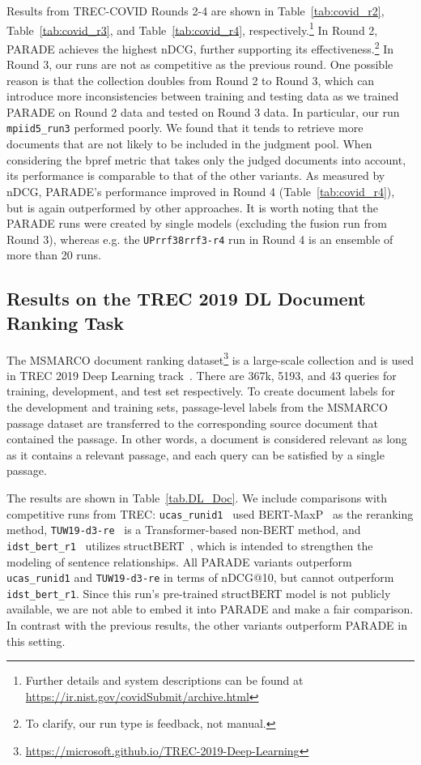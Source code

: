 \documentclass[11pt,a4paper]{article}
\newcommand{\parade}[1]{PARADE}
\begin{document}
Results from TREC-COVID Rounds 2-4 are shown in Table~\ref{tab:covid_r2}, Table~\ref{tab:covid_r3}, and Table~\ref{tab:covid_r4}, respectively.\footnote{Further details and system descriptions can be found at \url{https://ir.nist.gov/covidSubmit/archive.html}}
In Round 2, PARADE achieves the highest nDCG, further supporting its effectiveness.\footnote{To clarify, our run type is feedback, not manual.}
In Round 3, our runs are not as competitive as the previous round.
One possible reason is that the collection doubles from Round 2 to Round 3, which can introduce more inconsistencies between training and testing data as we trained PARADE on Round 2 data and tested on Round 3 data.
In particular, our run {\tt mpiid5\_run3} performed poorly.
We found that it tends to retrieve more documents that are not likely to be included in the judgment pool.
When considering the bpref metric that takes only the judged documents into account, its performance is comparable to that of the other variants.
As measured by nDCG, PARADE's performance improved in Round 4 (Table~\ref{tab:covid_r4}), but is again outperformed by other approaches.
It is worth noting that the PARADE runs were created by single models (excluding the fusion run from Round 3), whereas e.g. the {\tt UPrrf38rrf3-r4} run in Round 4 is an ensemble of more than 20 runs.


\subsection{Results on the TREC 2019 DL Document Ranking Task}
\label{sec:trec_DL}

The MSMARCO document ranking dataset\footnote{\url{https://microsoft.github.io/TREC-2019-Deep-Learning}} is a large-scale collection and is used in TREC 2019 Deep Learning track~\cite{DBLP:conf/trec/CraswellMYCV19}.
There are 367k, 5193, and 43 queries for training, development, and test set respectively.
To create document labels for the development and training sets, passage-level labels from the MSMARCO passage dataset are transferred to the corresponding source document that contained the passage.
In other words, a document is considered relevant as long as it contains a relevant passage, and each query can be satisfied by a single passage.

The results are shown in Table~\ref{tab.DL_Doc}.
We include comparisons with competitive runs from TREC:
{\tt ucas\_runid1}~\citep{DBLP:conf/trec/ChenLHS19} used BERT-MaxP~\citep{DBLP:conf/sigir/DaiC19} as the reranking method,
{\tt TUW19-d3-re}~\citep{DBLP:conf/trec/HofstatterZH19} is a Transformer-based non-BERT method, and
{\tt idst\_bert\_r1}~\citep{DBLP:conf/trec/YanLWBWXS19} utilizes structBERT~\cite{DBLP:conf/iclr/0225BYWXBPS20}, which is intended to strengthen the modeling of sentence relationships.
All PARADE variants outperform {\tt ucas\_runid1} and {\tt TUW19-d3-re} in terms of nDCG@10, but cannot outperform {\tt idst\_bert\_r1}.
Since this run's pre-trained structBERT model is not publicly available, we are not able to embed it into PARADE and make a fair comparison.
In contrast with the previous results, the other variants outperform \parade{} in this setting.
\end{document}
